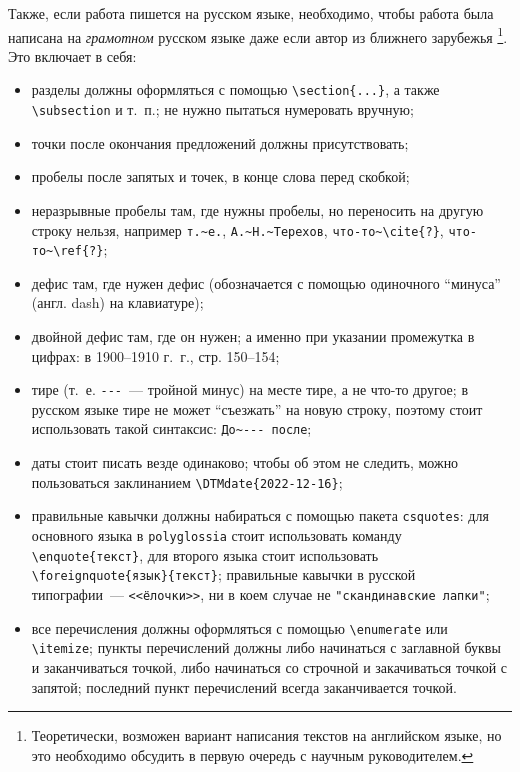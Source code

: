 Также, если работа пишется на русском языке, необходимо, чтобы работа была написана на \textit{грамотном} русском языке даже если автор из ближнего зарубежья%
\footnote{Теоретически, возможен вариант написания текстов на английском языке, но это необходимо обсудить в первую очередь с научным руководителем.}.
Это включает в себя:
\begin{itemize}
    \item разделы должны оформляться с помощью \verb=\section{...}=, а также \verb=\subsection= и т.~п.; не нужно пытаться нумеровать вручную;
    \item точки после окончания предложений должны присутствовать;
    \item пробелы после запятых и точек, в конце слова перед скобкой;
    \item неразрывные пробелы там, где нужны пробелы, но переносить на другую строку нельзя, например \verb=т.~е.=, \verb=А.~Н.~Терехов=, \verb=что-то~\cite{?}=, \verb=что-то~\ref{?}=;
    \item дефис там, где нужен дефис (обозначается с помощью одиночного \enquote{минуса} (англ. dash) на клавиатуре);
    \item двойной дефис там, где он нужен; а именно  при указании проме\-жутка в цифрах: в 1900--1910 г.~г., стр. 150--154;
    \item тире (т.~е. \verb=---=~--- тройной минус) на месте тире, а не что-то другое; в русском языке тире не может \enquote{съезжать} на новую строку, поэтому стоит использовать такой синтаксис: \verb=До~--- после=;
    \item даты стоит писать везде одинаково; чтобы об этом не следить, можно пользоваться заклинанием \verb=\DTMdate{2022-12-16}=;
    \item правильные кавычки должны набираться с помощью пакета \texttt{csquotes}: для основного языка в \texttt{polyglossia} стоит использовать команду \verb=\enquote{текст}=, для второго языка стоит использовать \verb=\foreignquote{язык}{текст}=; правильные кавычки в русской типографии~--- \verb=<<ёлочки>>=, ни в коем случае не \verb="скандинавские лапки"=;
    \item все перечисления должны оформляться с помощью \verb=\enumerate= или \verb=\itemize=; пункты перечислений должны либо начинаться с заглавной буквы и заканчиваться точкой, либо начинаться со строчной и закачиваться точкой с запятой; последний пункт пере\-числений всегда заканчивается точкой.

\end{itemize}
